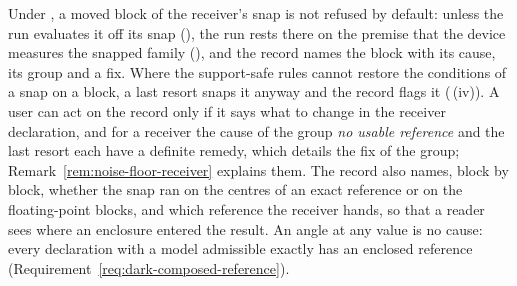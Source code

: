 Under , a moved block of the receiver's
snap is not refused by default: unless the run evaluates it off its snap
(), the run rests there on the
premise that the device measures the snapped family
(), and the record names the block
with its cause, its group and a fix. Where the support-safe rules cannot
restore the conditions of a snap on a block, a last resort snaps it anyway
and the record flags it (\,(iv)). A
user can act on the record only if it says what to change in the receiver
declaration, and for a receiver the cause of the group \emph{no usable
reference} and the last resort each have a definite remedy, which details
the fix of the group; Remark~\ref{rem:noise-floor-receiver} explains them.
The record also names, block by block, whether the snap ran on the centres
of an exact reference or on the floating-point blocks, and which reference
the receiver hands, so that a reader sees where an enclosure entered the
result. An angle at any value is no cause: every declaration with a model
admissible exactly has an enclosed reference
(Requirement~\ref{req:dark-composed-reference}).


